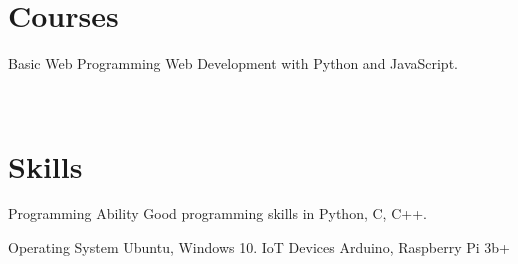 \documentclass[]{cv-style}          %
\begin{document}
\section{Courses}
  
\begin{entrylist}

\entry
  {}
  {Basic Web Programming}
  {}
  {\jobtitle{}Web Development with Python and JavaScript. }


\end{entrylist}\





  

\section{Skills}
  \vspace{-0.2cm}

\begin{entrylist}

\entry
  {}
  {Programming Ability }
  {}
  {\jobtitle{}Good programming skills in Python, C, C++. }
 
 \entry
  {}
  {Operating System }
  {}
  {\jobtitle{}Ubuntu, Windows 10. }
  \entry
  {}
  {IoT Devices}
  {}
  {\jobtitle{}Arduino, Raspberry Pi 3b+ }

 
  
  

\end{entrylist}


\end{document}
